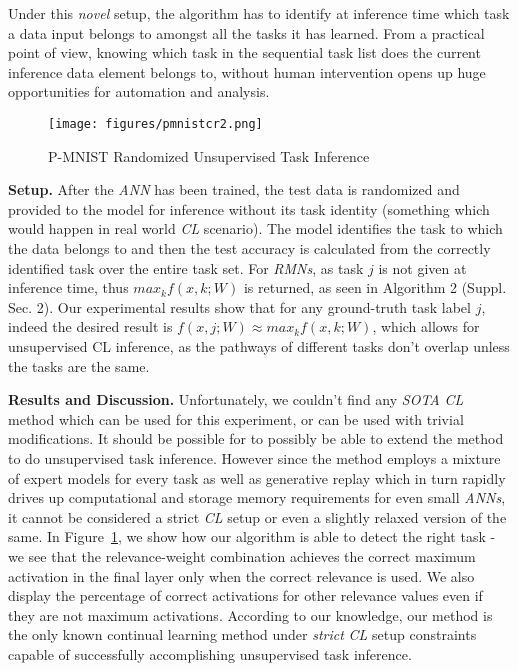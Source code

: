\documentclass{article}
\begin{document}
Under this \textit{novel} setup, the algorithm has to identify at inference time which task a data input belongs to amongst all the tasks it has learned. From a practical point of view, knowing which task in the sequential task list does the current inference data element belongs to, without human intervention opens up huge opportunities for automation and analysis. 
\begin{figure}[ht]
\begin{center}
\centerline{\texttt{[image: figures/pmnistcr2.png]}}
\vspace*{-.2in}
\caption{P-MNIST Randomized Unsupervised Task Inference}
\label{pmnist-cr2}
\end{center}
\vskip -0.35in
\end{figure}

\textbf{Setup.} After the \textit{ANN} has been trained, the test data is randomized and provided to the model for inference without its task identity (something which would happen in real world \textit{CL} scenario). The model identifies the task to which the data belongs to and then the test accuracy is calculated from the correctly identified task over the entire task set.
For \textit{RMNs}, as task $j$ is not given at inference time, thus $max_k f(x, k; W)$ is returned, as seen in Algorithm 2 (Suppl. Sec. 2).
Our experimental results show that for any ground-truth task label $j$, indeed the desired result is $f(x, j; W) \approx max_k f(x, k; W)$, which allows for unsupervised CL inference, as the pathways of different tasks don't overlap unless the tasks are the same.

\textbf{Results and Discussion.}
Unfortunately, we couldn't find any \textit{SOTA} \textit{CL} method which can be used for this experiment, or can be used with trivial modifications. It should be possible for \cite{lee_continual_2020} to possibly be able to extend the method to do unsupervised task inference. However since the method employs a mixture of expert models for every task as well as generative replay which in turn rapidly drives up computational and storage memory requirements for even small \textit{ANNs}, it cannot be considered a strict \textit{CL} setup or even a slightly relaxed version of the same. In Figure~\ref{pmnist-cr2}, we show how our algorithm is able to detect the right task - we see that the relevance-weight combination achieves the correct maximum activation in the final layer only when the correct relevance is used. We also display the percentage of correct activations for other relevance values even if they are not maximum activations. According to our knowledge, our method is the only known continual learning method under \textit{strict} \textit{CL} setup constraints capable of successfully accomplishing unsupervised task inference.
\end{document}

